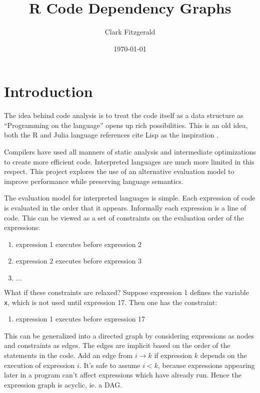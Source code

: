 \documentclass[12pt]{article}
\begin{document}
\title{R Code Dependency Graphs}
\date{\today}
\author{Clark Fitzgerald}
\maketitle

\begin{abstract}

\end{abstract}

\section{Introduction}

The idea behind code analysis is to treat the code itself as a data
structure as ``Programming on the language'' opens up rich possibilities.
This is an old idea, both the R and Julia language references cite Lisp
as the inspiration \cite{Rlang} \cite{bezanson2014julia}.

Compilers have used all manners of static analysis and
intermediate optimizations to create more efficient code. Interpreted
languages are much more limited in this respect. This project explores
the use of an alternative evaluation model to improve performance while
preserving language semantics.

The evaluation model for interpreted languages is simple. Each
expression of code is evaluated in the order that it appears. Informally
each expression is a line of code. This can be
viewed as a set of constraints on the evaluation order of the expressions:
\begin{enumerate}
    \item expression 1 executes before expression 2
    \item expression 2 executes before expression 3
    \item $\dots$
\end{enumerate}
What if these constraints are relaxed? Suppose expression 1 defines the variable
\texttt{x}, which is not used until expression 17. Then one has the
constraint:
\begin{enumerate}
    \item expression 1 executes before expression 17
\end{enumerate}
This can be generalized into a directed graph by considering expressions as
nodes and constraints as edges. The edges are implicit based on the order
of the statements in the code. Add an edge from $i \rightarrow k$ if
expression $k$ depends on the execution of expression $i$.  It's safe to
assume $i < k$, because expressions appearing later in a program can't
affect expressions which have already run. Hence the expression graph is
acyclic, ie. a DAG.
\end{document}
